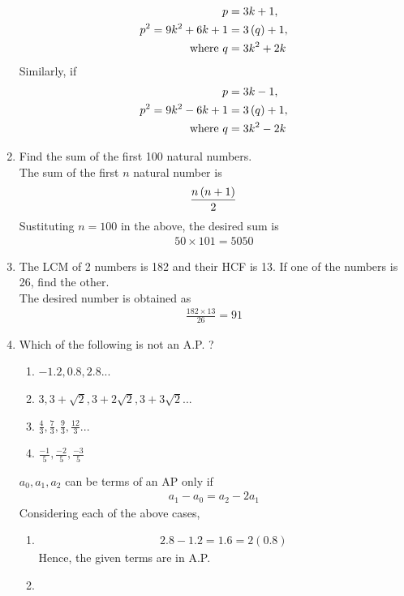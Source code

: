 \documentclass[journal,12pt,twocolumn]{IEEEtran}
\begin{document}
\begin{enumerate}
\begin{align}
		    p &= 3k+1, 
		    \\
		    p^2 = 9k^2 + 6k + 1&= 3\left(q\right)+1, 
		    \\
		    \text{where } q &= 3k^2+2k
	    \end{align}
	    Similarly, if
	    \begin{align}
		    p &= 3k-1, 
		    \\
		    p^2 = 9k^2 - 6k + 1&= 3\left(q\right)+1, 
		    \\
		    \text{where } q &= 3k^2-2k
	    \end{align}
\item Find the sum of the first 100 natural numbers.\\
	\solution The sum of the first $n$ natural number is 
  \begin{align}
	  \frac{n\left(n+1\right)}{2}
  \end{align}
Sustituting $n = 100$ in the above, the desired sum is 
  \begin{align}
50 \times 101 = 5050	
  \end{align}
\item The LCM of 2 numbers is 182 and their HCF is 13. If one of the numbers is 26, find the other.\\
\solution The desired number is obtained as
  \begin{align}
	  \frac{182 \times 13}{26} = 91
  \end{align}
\item Which of the following is not an A.P. ?
\begin{enumerate}
    \item $-1.2, 0.8, 2.8...$
    \item $3, 3 + \sqrt{2}, 3 + 2\sqrt{2},3 + 3\sqrt{2}...$
    \item $\frac{4}{3}, \frac{7}{3}, \frac{9}{3}, \frac{12}{3}...$
    \item $\frac{-1}{5}, \frac{-2}{5}, \frac{-3}{5}$
\end{enumerate}
\solution $a_0, a_1, a_2$ can be terms of an AP only if 
		\begin{align}
	a_1 - 	a_0 = a_2 - 2a_1
		\end{align}
		Considering each of the above cases, 
		\begin{enumerate}
			\item 
				\begin{align}
					2.8 - 1.2 = 1.6 = 2(0.8)
				\end{align}
				Hence, the given terms are in A.P.
			\item 

\end{enumerate}
\end{enumerate}
\end{document}
